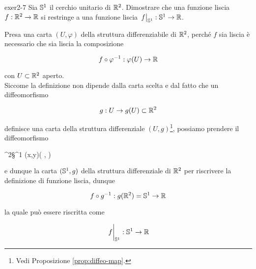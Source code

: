 
{exer2-7}
{
Sia $ \S^{1} $ il cerchio unitario di $ \R^{2} $. Dimostrare che una funzione liscia $ f : \R^{2} \to \R $ si restringe a una funzione liscia $ \eval{f}_{\S^{1}} : \S^{1} \to \R $.
}
{
Presa una carta $ (U,\varphi) $ della struttura differenziabile di $ \R^{2} $, perché $ f $ sia liscia è necessario che sia liscia la composizione

\begin{equation}
	f \circ \varphi^{-1} : \varphi(U) \to \R
\end{equation}

con $ U \subset \R^{2} $ aperto. \\
Siccome la definizione non dipende dalla carta scelta e dal fatto che un diffeomorfismo

\begin{equation}
	g : U \to g(U) \subset \R^{2}
\end{equation}

definisce una carta della struttura differenziale $ (U,g) $\footnote{%
	Vedi Proposizione \ref{prop:diffeo-map}.%
}, possiamo prendere il diffeomorfismo

	{\R^{2}}{\S^{1}}
	{(x,y)}{\left( , \right)}

e dunque la carta $ (\S^{1},g) $ della struttura differenziale di $ \R^{2} $ per riscrivere la definizione di funzione liscia, dunque

\begin{equation}
	f \circ g^{-1} : g(\R^{2}) = \S^{1} \to \R
\end{equation}

la quale può essere riscritta come

\begin{equation}
	\eval{f}_{\S^{1}} : \S^{1} \to \R
\end{equation}
}



